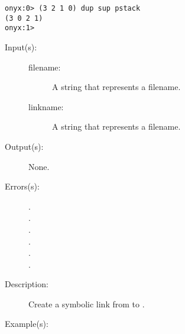 \begin{description}
\begin{description}
\begin{verbatim}
onyx:0> (3 2 1 0) dup sup pstack
(3 0 2 1)
onyx:1>
		\end{verbatim}
	\end{description}
\label{systemdict:symlink}
\item[{\onyxop{filename linkname}{symlink}{--}}: ]
	\begin{description}\item[]
	\item[Input(s): ]
		\begin{description}\item[]
		\item[filename: ]
			A string that represents a filename.
		\item[linkname: ]
			A string that represents a filename.
		\end{description}
	\item[Output(s): ] None.
	\item[Errors(s): ]
		\begin{description}\item[]
		\item[.]
		\item[.]
		\item[.]
		\item[.]
		\item[.]
		\item[.]
		\end{description}
	\item[Description: ]
		Create a symbolic link from  to
		.
	\item[Example(s): ]\begin{verbatim}


\end{verbatim}
\end{description}
\end{description}
